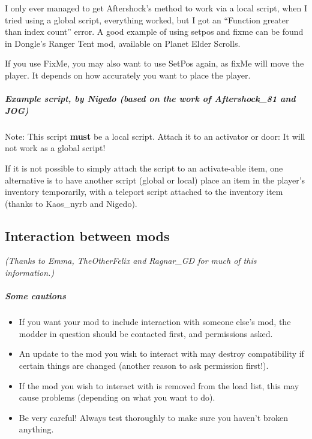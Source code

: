 \documentclass[
]{article}
\begin{document}
I only ever managed to get Aftershock's method to work via a local
script, when I tried using a global script, everything worked, but I got
an ``Function greater than index count'' error. A good example of using
setpos and fixme can be found in Dongle's Ranger Tent mod, available on
Planet Elder Scrolls.

If you use FixMe, you may also want to use SetPos again, as fixMe will
move the player. It depends on how accurately you want to place the
player.

\hypertarget{example-script-by-nigedo-based-on-the-work-of-aftershock_81-and-jog}{%
\subparagraph{Example script, by Nigedo (based on the work of
Aftershock\_81 and
JOG)}\label{example-script-by-nigedo-based-on-the-work-of-aftershock_81-and-jog}}

Note: This script \textbf{must} be a local script. Attach it to an
activator or door: It will not work as a global script!



If it is not possible to simply attach the script to an activate-able
item, one alternative is to have another script (global or local) place
an item in the player's inventory temporarily, with a teleport script
attached to the inventory item (thanks to Kaos\_nyrb and Nigedo).

\hypertarget{interaction-between-mods}{%
\subsection{\texorpdfstring{\hfill\break
Interaction between
mods}{ Interaction between mods}}\label{interaction-between-mods}}

\emph{(Thanks to Emma, TheOtherFelix and Ragnar\_GD for much of this
information.)}

\hypertarget{some-cautions}{%
\subparagraph{Some cautions}\label{some-cautions}}

\begin{itemize}
\item
  If you want your mod to include interaction with someone else's mod,
  the modder in question should be contacted first, and permissions
  asked.
\item
  An update to the mod you wish to interact with may destroy
  compatibility if certain things are changed (another reason to ask
  permission first!).
\item
  If the mod you wish to interact with is removed from the load list,
  this may cause problems (depending on what you want to do).
\item
  Be very careful! Always test thoroughly to make sure you haven't
  broken anything.
\end{itemize}
\end{document}
